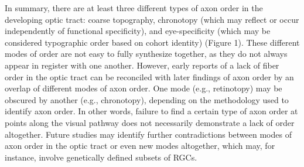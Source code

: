 In summary, there are at least three different types of axon order in the developing optic tract: coarse topography, chronotopy (which may reflect or occur independently of functional specificity), and eye-specificity (which may be considered typographic order based on cohort identity) (Figure 1).
These different modes of order are not easy to fully synthesize together, as they do not always appear in register with one another.
However, early reports of a lack of fiber order in the optic tract \cite{horton1979non} can be reconciled with later findings of axon order by an overlap of different modes of axon order.
One mode (e.g., retinotopy) may be obscured by another (e.g., chronotopy), depending on the methodology used to identify axon order.
In other words, failure to find a certain type of axon order at points along the visual pathway does not necessarily demonstrate a lack of order altogether.
Future studies may identify further contradictions between modes of axon order in the optic tract or even new modes altogether, which may, for instance, involve genetically defined subsets of RGCs.
